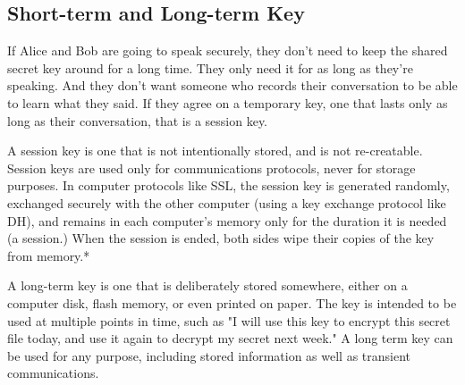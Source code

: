 {    \subsection{Short-term and Long-term Key}{
        If Alice and Bob are going to speak securely, they don't need to keep the shared secret key around for a long time. They only need it for as long as they're speaking. And they don't want someone who records their conversation to be able to learn what they said. If they agree on a temporary key, one that lasts only as long as their conversation, that is a session key.

        A session key is one that is not intentionally stored, and is not re-creatable. Session keys are used only for communications protocols, never for storage purposes. In computer protocols like SSL, the session key is generated randomly, exchanged securely with the other computer (using a key exchange protocol like DH), and remains in each computer's memory only for the duration it is needed (a session.) When the session is ended, both sides wipe their copies of the key from memory.*

        A long-term key is one that is deliberately stored somewhere, either on a computer disk, flash memory, or even printed on paper. The key is intended to be used at multiple points in time, such as "I will use this key to encrypt this secret file today, and use it again to decrypt my secret next week." A long term key can be used for any purpose, including stored information as well as transient communications.
    }
}